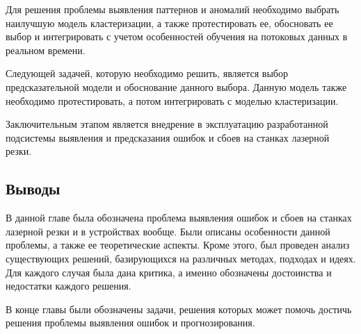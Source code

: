 Для решения проблемы выявления паттернов и аномалий необходимо выбрать наилучшую модель кластеризации,
а также протестировать ее, обосновать ее выбор и интегрировать с учетом особенностей обучения на потоковых данных в реальном времени.

Следующей задачей, которую необходимо решить, является выбор предсказательной модели и обоснование данного выбора.
Данную модель также необходимо протестировать, а потом интегрировать с моделью кластеризации.

Заключительным этапом является внедрение в эксплуатацию разработанной подсистемы выявления и предсказания ошибок и сбоев на станках лазерной резки.


\subsection{Выводы}

В данной главе была обозначена проблема выявления ошибок и сбоев на станках лазерной резки и в устройствах вообще.
Были описаны особенности данной проблемы, а также ее теоретические аспекты. Кроме этого, был проведен анализ
существующих решений, базирующихся на различных методах, подходах и идеях.
Для каждого случая была дана критика, а именно обозначены достоинства и недостатки каждого решения.

В конце главы были обозначены задачи, решения которых может помочь достичь решения проблемы выявления ошибок и прогнозирования.

\clearpage
